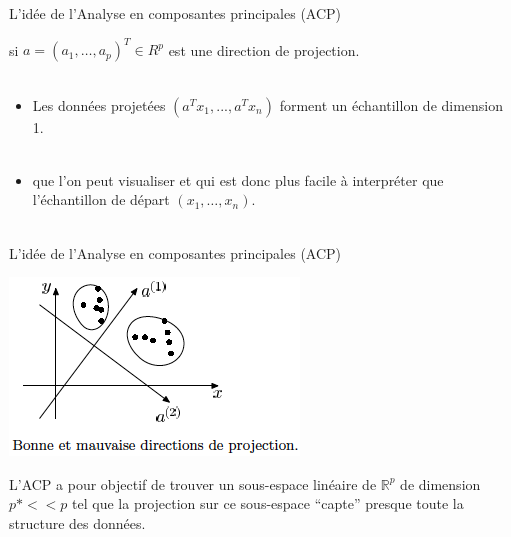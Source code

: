 \documentclass[11pt]{beamer}
\begin{document}
\begin{frame}{L’idée de l’Analyse en composantes principales (ACP)}


si $a = (a_1, \ldots ,a_p)^T \in R^p$ est une direction de projection.\\~\\

\begin{itemize}

\item Les données projetées $(a^T x_1, . . . ,a^T x_n)$ forment un échantillon de dimension 1.\\~\\

\item que l’on peut visualiser et qui est donc plus facile à interpréter que l’échantillon de départ $(x_1, \dots , x_n)$.\\~\\

\end{itemize}


\end{frame}

\begin{frame}{L’idée de l’Analyse en composantes principales (ACP)}

\centering

\includegraphics[scale=0.6]{ACP_ID.png} 

L’ACP a pour objectif de trouver un sous-espace linéaire de $\mathbb{R}^p$ de dimension $p* << p$ tel que la projection sur ce sous-espace “capte” presque toute la structure des données.


\end{frame}
\end{document}
